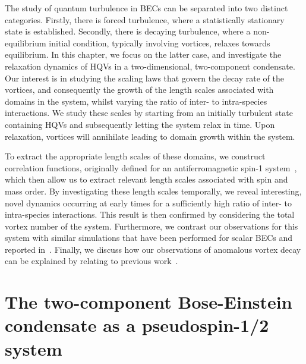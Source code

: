 The study of quantum turbulence in BECs can be separated into two distinct
categories.
Firstly, there is forced turbulence, where a statistically stationary state is
established.
Secondly, there is decaying turbulence, where a non-equilibrium initial
condition, typically involving vortices, relaxes towards equilibrium.
In this chapter, we focus on the latter case, and investigate the relaxation
dynamics of HQVs in a two-dimensional, two-component condensate.
Our interest is in studying the scaling laws that govern the decay rate of the
vortices, and consequently the growth of the length scales associated with
domains in the system, whilst varying the ratio of inter- to intra-species
interactions.
We study these scales by starting from an initially turbulent state containing
HQVs and subsequently letting the system relax in time.
Upon relaxation, vortices will annihilate leading to domain growth within
the system.

To extract the appropriate length scales of these domains, we construct
correlation functions, originally defined for an antiferromagnetic spin-1
system~\cite{Symes2017}, which then allow us to extract relevant length scales
associated with spin and mass order.
By investigating these length scales temporally, we reveal interesting,
novel dynamics occurring at early times for a sufficiently high ratio of
inter- to intra-species interactions.
This result is then confirmed by considering the total vortex number of the
system.
Furthermore, we contrast our observations for this system with similar
simulations that have been performed for scalar BECs and reported
in~\cite{Schole2012, Nowak2012, Karl2017}.
Finally, we discuss how our observations of anomalous vortex decay can be
explained by relating to previous work~\cite{Eto2011, Kasamatsu2016}.

\section{The two-component Bose-Einstein condensate as a pseudospin-1/2 system}
